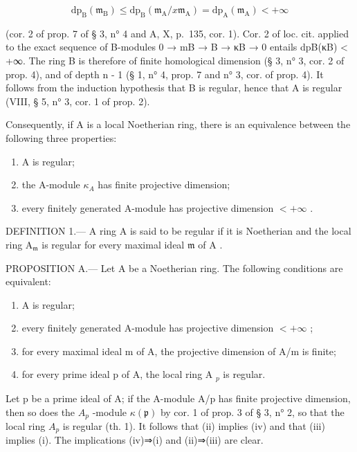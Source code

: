 \[
\mathrm{dp} _ {\mathrm{B}} \left(\mathfrak {m} _ {\mathrm{B}}\right) \leqslant \mathrm{dp} _ {\mathrm{B}} \left(\mathfrak {m} _ {\mathrm{A}} / x \mathfrak {m} _ {\mathrm{A}}\right) = \mathrm{dp} _ {\mathrm{A}} \left(\mathfrak {m} _ {\mathrm{A}}\right) <   + \infty
\]

(cor. 2 of prop. 7 of § 3, n° 4 and A, X, p.~135, cor. 1). Cor. 2 of loc. cit. applied to the exact sequence of B-modules 0 → mB → B → κB → 0 entails dpB(κB) \textless{} +∞. The ring B is therefore of finite homological dimension (§ 3, n° 3, cor. 2 of prop. 4), and of depth n - 1 (§ 1, n° 4, prop. 7 and n° 3, cor. of prop. 4). It follows from the induction hypothesis that B is regular, hence that A is regular (VIII, § 5, n° 3, cor. 1 of prop. 2).

Consequently, if A is a local Noetherian ring, there is an equivalence between the following three properties:

\begin{enumerate}
\def\labelenumi{(\roman{enumi})}
\item
  A is regular;
\item
  the A-module \(\kappa_{A}\) has finite projective dimension;
\item
  every finitely generated A-module has projective dimension \(<+\infty\) .
\end{enumerate}

DEFINITION 1.--- A ring A is said to be regular if it is Noetherian and the local ring \(\mathrm{A}_{\mathfrak{m}}\) is regular for every maximal ideal \(\mathfrak{m}\) of \(\mathrm{A}\) .

PROPOSITION A.--- Let A be a Noetherian ring. The following conditions are equivalent:

\begin{enumerate}
\def\labelenumi{(\roman{enumi})}
\item
  A is regular;
\item
  every finitely generated A-module has projective dimension \(< +\infty\) ;
\item
  for every maximal ideal m of A, the projective dimension of A/m is finite;
\item
  for every prime ideal p of A, the local ring A \(_{p}\) is regular.
\end{enumerate}

Let p be a prime ideal of A; if the A-module A/p has finite projective dimension, then so does the \(A_{p}\) -module \(\kappa(\mathfrak{p})\) by cor. 1 of prop. 3 of § 3, n° 2, so that the local ring \(A_{p}\) is regular (th. 1). It follows that (ii) implies (iv) and that (iii) implies (i). The implications (iv)⇒(i) and (ii)⇒(iii) are clear.

